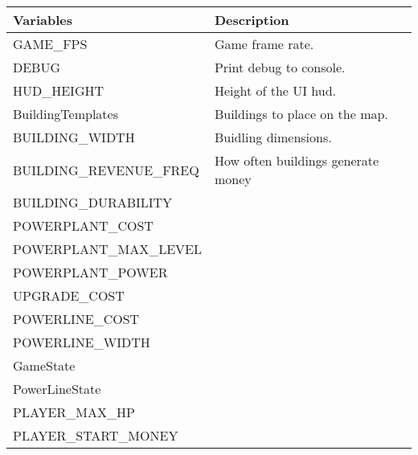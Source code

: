 	\begin{table}[H]
	\begin{tabular}{p{6cm} | p{6cm} }

	\hline
	\rowcolor{gray}
	Variables & Description \\ \hline
	GAME\_FPS & Game frame rate. \\ \hline
	DEBUG & Print debug to console. \\ \hline
	HUD\_HEIGHT & Height of the UI hud. \\ \hline
	BuildingTemplates & Buildings to place on the map. \\ \hline
	BUILDING\_WIDTH & Buidling dimensions. \\ \hline
	BUILDING\_REVENUE\_FREQ & How often buildings generate money \\ \hline
	BUILDING\_DURABILITY &  \\ \hline
	POWERPLANT\_COST & \\ \hline
	POWERPLANT\_MAX\_LEVEL & \\ \hline
	POWERPLANT\_POWER & \\ \hline
	UPGRADE\_COST & \\ \hline
	POWERLINE\_COST & \\ \hline
	POWERLINE\_WIDTH & \\ \hline
	GameState & \\ \hline
	PowerLineState & \\ \hline
	PLAYER\_MAX\_HP & \\ \hline
	PLAYER\_START\_MONEY & \\ \hline

	\end{tabular}
	\end{table}

